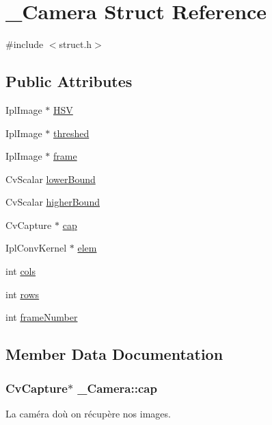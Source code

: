 \hypertarget{struct___camera}{}\section{\+\_\+\+Camera Struct Reference}
\label{struct___camera}


{\ttfamily \#include $<$struct.\+h$>$}

\subsection*{Public Attributes}
\begin{DoxyCompactItemize}
\item 
Ipl\+Image $\ast$ \hyperlink{struct___camera_acded182f5a3fc70318c5fca5b19bb9fe}{H\+SV}
\item 
Ipl\+Image $\ast$ \hyperlink{struct___camera_a07cebbf32e748bf08365cfe9e0726430}{threshed}
\item 
Ipl\+Image $\ast$ \hyperlink{struct___camera_a012f5d979064f440339281889f57a640}{frame}
\item 
Cv\+Scalar \hyperlink{struct___camera_a2fbe653d44adfd2e41d64b8ee08911f1}{lower\+Bound}
\item 
Cv\+Scalar \hyperlink{struct___camera_aba192c658e63df9203ec78a99e892d27}{higher\+Bound}
\item 
Cv\+Capture $\ast$ \hyperlink{struct___camera_a98541d23d3e26578d76145d7db507cfb}{cap}
\item 
Ipl\+Conv\+Kernel $\ast$ \hyperlink{struct___camera_a069a1733c9e85ccd40e15c392d0bb0bd}{elem}
\item 
int \hyperlink{struct___camera_a0bf89c266a3d53a2e1a016a61c931868}{cols}
\item 
int \hyperlink{struct___camera_a703a36cc8065f37869cc02c6b0e1c87f}{rows}
\item 
int \hyperlink{struct___camera_ae7658cf59eeb1a655b1ac5a536cc7dd4}{frame\+Number}
\end{DoxyCompactItemize}


\subsection{Member Data Documentation}
\subsubsection[{\texorpdfstring{cap}{cap}}]{\setlength{\rightskip}{0pt plus 5cm}Cv\+Capture$\ast$ \+\_\+\+Camera\+::cap}\hypertarget{struct___camera_a98541d23d3e26578d76145d7db507cfb}{}\label{struct___camera_a98541d23d3e26578d76145d7db507cfb}
La caméra d\textquotesingle{}où on récupère nos images. 
